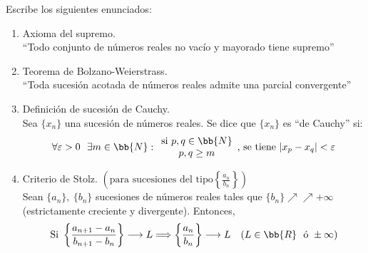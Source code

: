 \documentclass[12pt]{article}
\begin{document}
    \begin{ejercicio}[2 puntos]
        Escribe los siguientes enunciados:
        \begin{enumerate}
            \item Axioma del supremo.\\
            ``Todo conjunto de números reales no vacío y mayorado tiene supremo''
            \item Teorema de Bolzano-Weierstrass.\\
            ``Toda sucesión acotada de números reales admite una parcial convergente''
            \item Definición de sucesión de Cauchy.\\
            Sea $\{x_n\}$ una sucesión de números reales. Se dice que $\{x_n\}$ es ``de Cauchy'' si:
            \[
                \forall \varepsilon>0 \ \ \exists m \in \bb{N} : 
                \begin{array}{c}
                    \text{si }p,q \in \bb{N}\\
                    p,q \geq m
                \end{array}
                \text{, se tiene } |x_p - x_q|<\varepsilon
            \]
            \item Criterio de Stolz. $\left(\text{para sucesiones del tipo} \left\{ \frac{a_n}{b_n}\right\}\right)$\\
            Sean $\{a_n\},\ \{b_n\}$ sucesiones de números reales tales que $\{b_n\}\nearrow \nearrow + \infty $ (estrictamente creciente y divergente). Entonces,\\
            \[
                \text{Si } \left\{ \dfrac{a_{n+1}-a_n}{b_{n+1}-b_n}\right\}\longrightarrow L \Longrightarrow \left\{ \dfrac{a_n}{b_n}\right\}\longrightarrow L \ \ \ (L \in \bb{R}\  \text{ ó } \pm \infty)
            \]
 
            
            
        \end{enumerate}
    \end{ejercicio}
\end{document}
